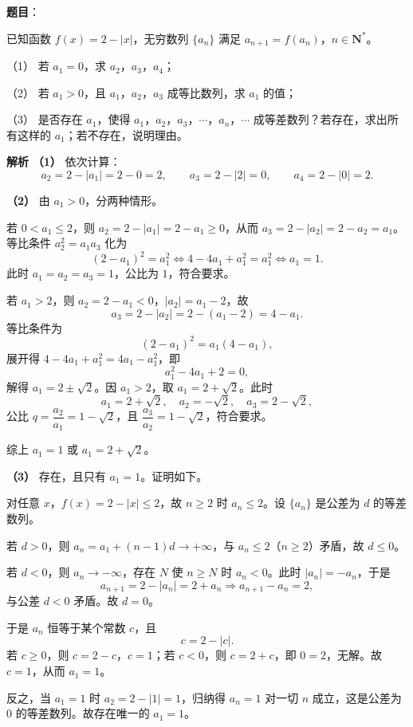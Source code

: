 \begin{answer}

\textbf{题目}：

已知函数 $f(x)=2-|x|$，无穷数列 $\{a_n\}$ 满足 $a_{n+1}=f(a_n)$，$n\in\mathbf N^*$。

（1） 若 $a_1=0$，求 $a_2$，$a_3$，$a_4$；

（2） 若 $a_1>0$，且 $a_1$，$a_2$，$a_3$ 成等比数列，求 $a_1$ 的值；

（3） 是否存在 $a_1$，使得 $a_1$，$a_2$，$a_3$，$\cdots$，$a_n$，$\cdots$ 成等差数列？若存在，求出所有这样的 $a_1$；若不存在，说明理由。

\textbf{解析}
\textbf{（1）} 依次计算：
\nopagebreak[4]
\[a_2=2-|a_1|=2-0=2,\qquad a_3=2-|2|=0,\qquad a_4=2-|0|=2.\]

\textbf{（2）} 由 $a_1>0$，分两种情形。

若 $0<a_1\leqslant2$，则 $a_2=2-|a_1|=2-a_1\geqslant0$，从而 $a_3=2-|a_2|=2-a_2=a_1$。等比条件 $a_2^2=a_1a_3$ 化为
\nopagebreak[4]
\[(2-a_1)^2=a_1^2\iff4-4a_1+a_1^2=a_1^2\iff a_1=1.\]
此时 $a_1=a_2=a_3=1$，公比为 $1$，符合要求。

若 $a_1>2$，则 $a_2=2-a_1<0$，$|a_2|=a_1-2$，故
\nopagebreak[4]
\[a_3=2-|a_2|=2-(a_1-2)=4-a_1.\]
等比条件为
\nopagebreak[4]
\[(2-a_1)^2=a_1(4-a_1),\]
展开得 $4-4a_1+a_1^2=4a_1-a_1^2$，即
\nopagebreak[4]
\[a_1^2-4a_1+2=0,\]
解得 $a_1=2\pm\sqrt2$。因 $a_1>2$，取 $a_1=2+\sqrt2$。此时
\nopagebreak[4]
\[a_1=2+\sqrt2,\quad a_2=-\sqrt2,\quad a_3=2-\sqrt2,\]
公比 $q=\dfrac{a_2}{a_1}=1-\sqrt2$，且 $\dfrac{a_3}{a_2}=1-\sqrt2$，符合要求。

综上 $a_1=1$ 或 $a_1=2+\sqrt2$。

\textbf{（3）} 存在，且只有 $a_1=1$。证明如下。

对任意 $x$，$f(x)=2-|x|\leqslant2$，故 $n\geqslant2$ 时 $a_n\leqslant2$。设 $\{a_n\}$ 是公差为 $d$ 的等差数列。

若 $d>0$，则 $a_n=a_1+(n-1)d\to+\infty$，与 $a_n\leqslant2$（$n\geqslant2$）矛盾，故 $d\leqslant0$。

若 $d<0$，则 $a_n\to-\infty$，存在 $N$ 使 $n\geqslant N$ 时 $a_n<0$。此时 $|a_n|=-a_n$，于是
\nopagebreak[4]
\[a_{n+1}=2-|a_n|=2+a_n\Longrightarrow a_{n+1}-a_n=2,\]
与公差 $d<0$ 矛盾。故 $d=0$。

于是 $a_n$ 恒等于某个常数 $c$，且
\nopagebreak[4]
\[c=2-|c|.\]
若 $c\geqslant0$，则 $c=2-c$，$c=1$；若 $c<0$，则 $c=2+c$，即 $0=2$，无解。故 $c=1$，从而 $a_1=1$。

反之，当 $a_1=1$ 时 $a_2=2-|1|=1$，归纳得 $a_n=1$ 对一切 $n$ 成立，这是公差为 $0$ 的等差数列。故存在唯一的 $a_1=1$。




\end{answer}
